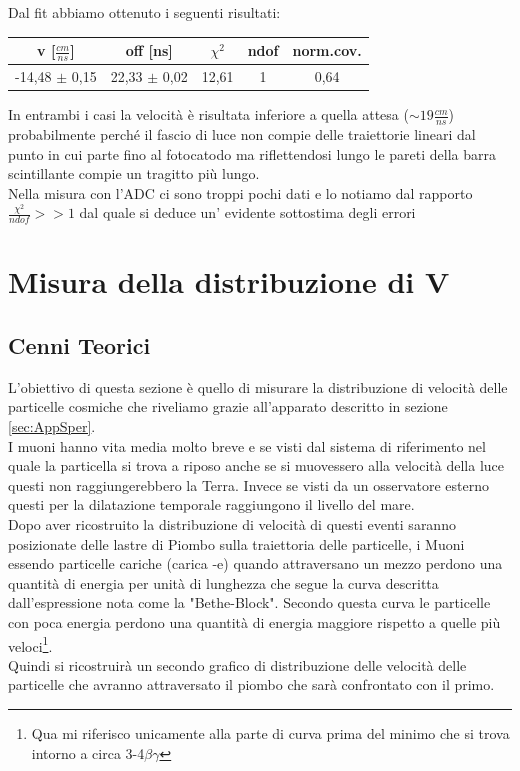 \documentclass[a4paper]{article}
\begin{document}
Dal fit abbiamo ottenuto i seguenti risultati:

\begin{tabular}{|c|c|c|c|c|}
\hline
v [$\frac{cm}{ns}$] & off [ns] & $\chi ^2$ & ndof & norm.cov.  \\
\hline
-14,48 $\pm$ 0,15 & 22,33 $\pm$ 0,02 & 12,61 & 1 & 0,64\\
\hline
\end{tabular}

In entrambi i casi la velocità è risultata inferiore a quella attesa ($\sim 19\frac{cm}{ns}$) probabilmente perché il fascio di luce non compie delle traiettorie lineari dal punto in cui parte fino al fotocatodo ma riflettendosi lungo le pareti della barra scintillante compie un tragitto più lungo.\\
Nella misura con l'ADC ci sono troppi pochi dati e lo notiamo dal rapporto $\frac{\chi^2}{ndof}>>1$ dal quale si deduce un' evidente sottostima degli errori 

\newpage
\section{Misura della distribuzione di V}
\label{sec:MisuraVMu}
\subsection{Cenni Teorici}
L'obiettivo di questa sezione è quello di misurare la distribuzione di velocità delle particelle cosmiche che riveliamo grazie all'apparato descritto in sezione \ref{sec:AppSper}.\\
I muoni hanno vita media molto breve e se visti dal sistema di riferimento nel quale la particella si trova a riposo anche se si muovessero alla velocità della luce questi non raggiungerebbero la Terra. Invece se visti da un osservatore esterno questi per la dilatazione temporale raggiungono il livello del mare.\\
Dopo aver ricostruito la distribuzione di velocità di questi eventi saranno posizionate delle lastre di Piombo sulla traiettoria delle particelle, i Muoni essendo particelle cariche (carica -e) quando attraversano un mezzo perdono una quantità di energia per unità di lunghezza che segue la curva descritta dall'espressione nota come la "Bethe-Block". Secondo questa curva le particelle con poca energia perdono una quantità di energia maggiore rispetto a quelle più veloci\footnote{Qua mi riferisco unicamente alla parte di curva prima del minimo che si trova intorno a circa 3-4$\beta \gamma$}.\\
Quindi si ricostruirà un secondo grafico di distribuzione delle velocità delle particelle che avranno attraversato il piombo che sarà confrontato con il primo.
\end{document}

